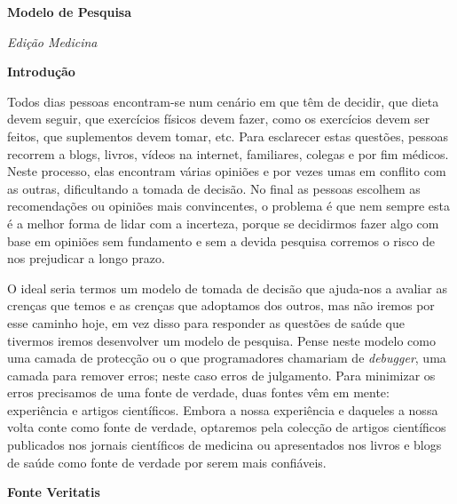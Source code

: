 \documentclass[12pt]{article}
\begin{document}
 

\begin{titlepage}
    \begin{center}
        \Huge\textbf{Modelo de Pesquisa}
         
        \Large\textit{Edi\c c\~ao Medicina}
         
        \vspace{10cm}
    \end{center}
\end{titlepage}

\begin{center}
    \Huge\textbf{Introdu\c c\~ao}
\end{center}

Todos dias pessoas encontram-se num cen\'ario em que t\^em de decidir, que
dieta devem seguir, que exerc\'icios f\'isicos devem fazer, como os
exerc\'icios devem ser
feitos,  que suplementos
devem tomar, etc. Para esclarecer estas quest\~oes, pessoas recorrem a blogs,
livros, v\'ideos na internet, familiares, colegas e por fim  m\'edicos. Neste
processo, elas encontram v\'arias
opini\~oes e por vezes umas em conflito com as outras, dificultando a tomada
de decis\~ao. 
No final as pessoas escolhem as recomenda\c c\~oes ou opini\~oes mais
convincentes, o problema \'e que nem sempre esta \'e a melhor forma de lidar
com a incerteza, porque se decidirmos fazer algo com base em opini\~oes
sem fundamento e sem a devida pesquisa corremos o risco de nos prejudicar a longo prazo. 

O ideal seria termos um modelo de tomada de decis\~ao que ajuda-nos a avaliar as
cren\c cas que temos e as cren\c cas que adoptamos dos outros, mas n\~ao iremos
por esse caminho hoje, em vez disso para responder as quest\~oes de sa\'ude que
tivermos iremos desenvolver um modelo de pesquisa.  
Pense neste modelo como  uma camada de protec\c c\~ao ou o que programadores chamariam de \textit{debugger}, uma camada para remover erros; neste caso erros de julgamento.  
Para minimizar os erros precisamos de uma fonte de verdade, duas fontes v\^em
em mente: experi\^encia e artigos cient\'ificos. Embora a nossa experi\^encia e
daqueles a nossa volta conte como fonte de verdade, optaremos pela colec\c c\~ao
de artigos cient\'ificos publicados nos jornais cient\'ificos de medicina ou
apresentados nos livros e blogs de sa\'ude como fonte de verdade por serem mais
confi\'aveis.   
\pagebreak


\begin{center}
    \Huge\textbf{Fonte Veritatis}
\end{center}
\end{document}
